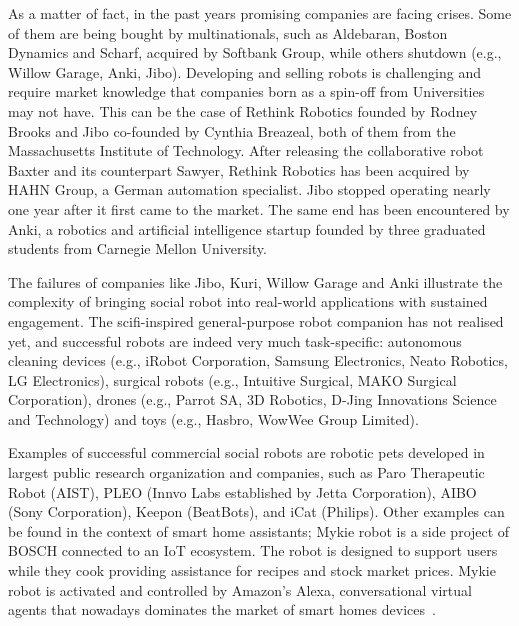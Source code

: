\documentclass[11pt,a4paper]{report}
\begin{document}
As a matter of fact, in the past years promising companies are facing crises.
Some of them are being bought by multinationals, such as Aldebaran, Boston
Dynamics and Scharf, acquired by Softbank Group, while others shutdown (e.g.,
Willow Garage, Anki, Jibo). Developing and selling robots is challenging and
require market knowledge that companies born as a spin-off from Universities may
not have. This can be the case of Rethink Robotics founded by Rodney Brooks and
Jibo co-founded by Cynthia Breazeal, both of them from the Massachusetts
Institute of Technology. After releasing the collaborative robot Baxter and its
counterpart Sawyer, Rethink Robotics has been acquired by HAHN Group, a German
automation specialist. Jibo stopped operating nearly one year after it first
came to the market. The same end has been encountered by Anki, a robotics and
artificial intelligence startup founded by three graduated students from
Carnegie Mellon University.

The failures of companies like Jibo, Kuri, Willow Garage and Anki illustrate the
complexity of bringing social robot into real-world applications with sustained
engagement. The scifi-inspired general-purpose robot companion has not realised
yet, and successful robots are indeed very much task-specific: autonomous
cleaning devices (e.g., iRobot Corporation, Samsung Electronics, Neato Robotics,
LG Electronics), surgical robots (e.g., Intuitive Surgical, MAKO Surgical
Corporation), drones (e.g., Parrot SA, 3D Robotics, D-Jing Innovations Science
and Technology) and toys (e.g., Hasbro, WowWee Group Limited).

Examples of successful commercial social robots are robotic pets developed in
largest public research organization and companies, such as Paro Therapeutic
Robot (AIST), PLEO (Innvo Labs established by Jetta Corporation), AIBO (Sony
Corporation), Keepon (BeatBots), and iCat (Philips).  Other examples can be
found in the context of smart home assistants; Mykie robot is a side project of
BOSCH connected to an IoT ecosystem. The robot is designed to support users
while they cook providing assistance for recipes and stock market prices. Mykie
robot is activated and controlled by Amazon's Alexa, conversational virtual
agents that nowadays dominates the market of smart homes
devices~\cite{purington2017alexa, sciuto2018hey}.
\end{document}
